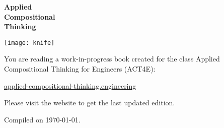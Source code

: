 \thispagestyle{empty}
\begin{center}

    \vspace{3cm}
    {\Huge\bfseries Applied\\[3mm]Compositional\\[3mm]Thinking}

\end{center}

\vfill
\begin{center}
    \texttt{[image: knife]}
\end{center}

\vfill
\clearpage
\vfill
You are reading a work-in-progress book created for the class Applied Compositional Thinking for Engineers (ACT4E):

\href{https://applied-compositional-thinking.engineering}{applied-compositional-thinking.engineering}

Please visit the website to get the last updated edition.

Compiled on \today.

